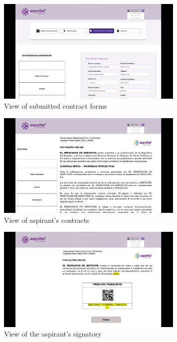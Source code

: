 \documentclass{scrreprt}
\begin{document}
\begin{figure}[H]
	\centering \small
	\includegraphics[width=0.8\textwidth]{WebPrototype/wflow-54.jpeg}
	\caption{View of submitted contract forms}
\end{figure}

\begin{figure}[H]
	\centering \small
	\includegraphics[width=0.8\textwidth]{WebPrototype/wflow-55.jpeg}
	\caption{View of aspirant's contracts}
\end{figure}

\begin{figure}[H]
	\centering \small
	\includegraphics[width=0.8\textwidth]{WebPrototype/wflow-56.jpeg}
	\caption{View of the aspirant's signatory}
\end{figure}
\end{document}
